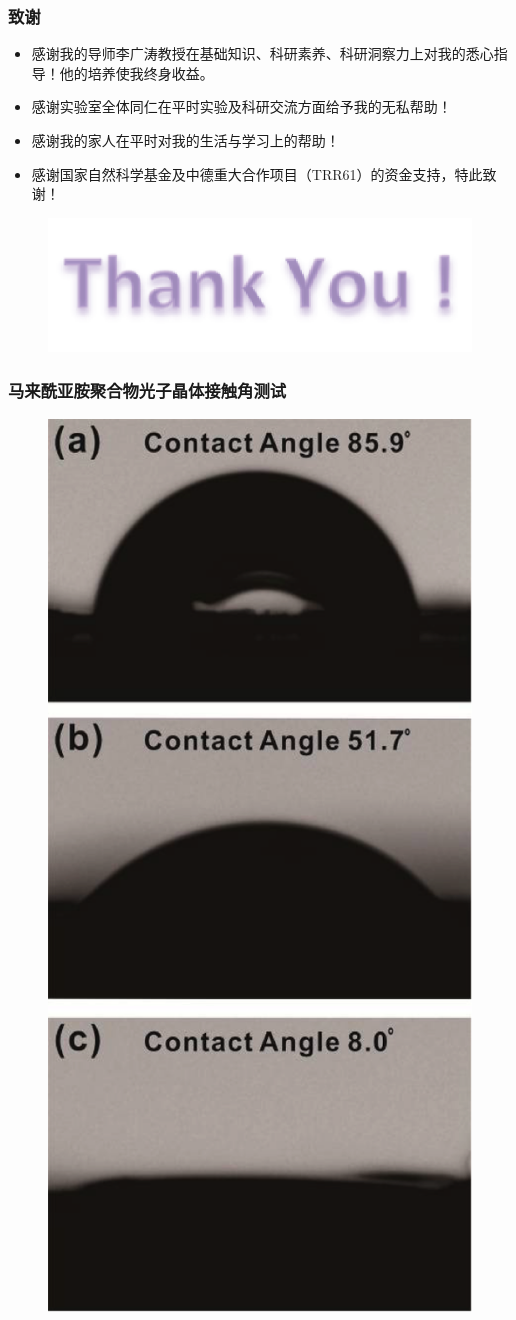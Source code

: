 \documentclass{beamer}
\begin{document}
\begin{frame}
  \frametitle{致谢}
  \begin{itemize}
    \item
    感谢我的导师李广涛教授在基础知识、科研素养、科研洞察力上对我的悉心指导！他的培养使我终身收益。
    \item
    感谢实验室全体同仁在平时实验及科研交流方面给予我的无私帮助！
    \item
    感谢我的家人在平时对我的生活与学习上的帮助！
    \item
    感谢国家自然科学基金及中德重大合作项目（TRR61）的资金支持，特此致谢！
  \end{itemize}
\end{frame}

\begin{frame}
  \begin{figure}[htbp]
    \centering
    \includegraphics[width=0.5\linewidth]{figures/thankyou.png}
  \end{figure}
\end{frame}

\begin{frame}
  \frametitle{马来酰亚胺聚合物光子晶体接触角测试}
  \begin{figure}[htbp]
    \centering
    \includegraphics[width=0.30\linewidth]{figures/Maleimide-CA.png}
  \end{figure} 
\end{frame}
\end{document}
